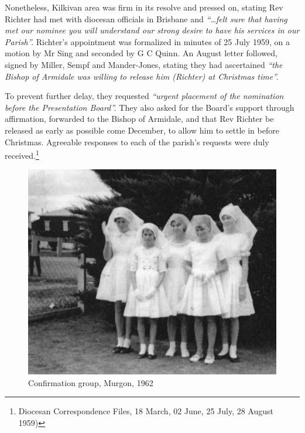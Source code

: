Nonetheless, Kilkivan area was firm in its resolve and pressed on, stating Rev Richter had met with diocesan officials in Brisbane and \emph{``\ldots felt sure that having met our nominee you will understand our strong desire to have his services in our Parish''.} Richter's appointment was formalized in minutes of 25 July 1959, on a motion by Mr Sing and seconded by G C Quinn. An August letter followed, signed by Miller, Sempf and Mander-Jones, stating they had ascertained \emph{``the Bishop of Armidale was willing to release him (Richter) at Christmas time''.}



To prevent further delay, they requested \emph{``urgent placement of the nomination before the Presentation Board''.} They also asked for the Board's support through affirmation, forwarded to the Bishop of Armidale, and that Rev Richter be released as early as possible come December, to allow him to settle in before Christmas. Agreeable responses to each of the parish's requests were duly received.\footnote{Diocesan Correspondence Files, 18 March, 02 June, 25 July, 28 August 1959)}








\begin{figure}
\begin{center}
\includegraphics[width=1.\linewidth,center]{../images/confirmation1962.jpg}
\caption{Confirmation group, Murgon, 1962}
\end{center}
\end{figure}




